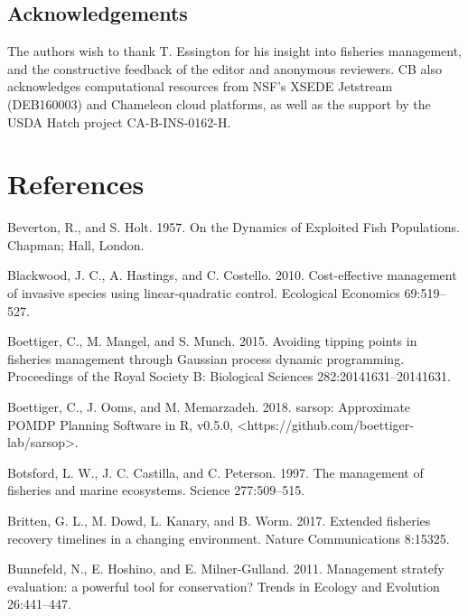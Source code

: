 \documentclass[3p]{elsarticle} %
\begin{document}
\hypertarget{acknowledgements}{%
\subsection{Acknowledgements}\label{acknowledgements}}

The authors wish to thank T. Essington for his insight into fisheries
management, and the constructive feedback of the editor and anonymous
reviewers. CB also acknowledges computational resources from NSF's XSEDE
Jetstream (DEB160003) and Chameleon cloud platforms, as well as the
support by the USDA Hatch project CA-B-INS-0162-H.

\hypertarget{references}{%
\section*{References}\label{references}}

\hypertarget{refs}{}
\leavevmode\hypertarget{ref-Beverton1957}{}%
Beverton, R., and S. Holt. 1957. On the Dynamics of Exploited Fish
Populations. Chapman; Hall, London.

\leavevmode\hypertarget{ref-Blackwood2010}{}%
Blackwood, J. C., A. Hastings, and C. Costello. 2010. Cost-effective
management of invasive species using linear-quadratic control.
Ecological Economics 69:519--527.

\leavevmode\hypertarget{ref-Boettiger2015}{}%
Boettiger, C., M. Mangel, and S. Munch. 2015. Avoiding tipping points in
fisheries management through Gaussian process dynamic programming.
Proceedings of the Royal Society B: Biological Sciences
282:20141631--20141631.

\leavevmode\hypertarget{ref-sarsop-pkg}{}%
Boettiger, C., J. Ooms, and M. Memarzadeh. 2018. sarsop: Approximate
POMDP Planning Software in R, v0.5.0,
\textless{}https://github.com/boettiger-lab/sarsop\textgreater{}.

\leavevmode\hypertarget{ref-Botsford1997}{}%
Botsford, L. W., J. C. Castilla, and C. Peterson. 1997. The management
of fisheries and marine ecosystems. Science 277:509--515.

\leavevmode\hypertarget{ref-Britten2017}{}%
Britten, G. L., M. Dowd, L. Kanary, and B. Worm. 2017. Extended
fisheries recovery timelines in a changing environment. Nature
Communications 8:15325.

\leavevmode\hypertarget{ref-Bunnefeld2011}{}%
Bunnefeld, N., E. Hoshino, and E. Milner-Gulland. 2011. Management
stratefy evaluation: a powerful tool for conservation? Trends in Ecology
and Evolution 26:441--447.
\end{document}
